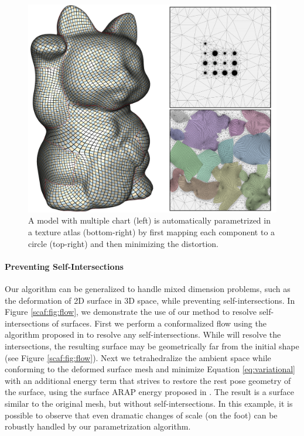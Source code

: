 \begin{figure}[t]
\includegraphics[width=\columnwidth]{scaf-tex/figs/maneki_neko_colorful}
\caption{A model with multiple chart (left) is automatically parametrized in a texture atlas (bottom-right) by first mapping each component to a circle (top-right) and then minimizing the distortion.}
\label{scaf:fig:packing2D}
\end{figure}

\paragraph{Preventing Self-Intersections}
Our algorithm can be generalized to handle mixed dimension problems, such as the deformation of 2D surface in 3D space, while preventing self-intersections. In Figure \ref{scaf:fig:flow}, we demonstrate the use of our method to resolve self-intersections of surfaces. First we perform a conformalized flow \cite{Kazhdan:2012} using the algorithm proposed in \cite{Sacht:2013} to resolve any self-intersections.  While \cite{Sacht:2013} will resolve the intersections, the resulting surface may be geometrically far from the initial shape (see Figure \ref{scaf:fig:flow}).  Next we tetrahedralize the ambient space while conforming to the deformed surface mesh and minimize Equation \ref{eq:variational} with an additional energy term that strives to restore the rest pose geometry of the surface, using the surface ARAP energy proposed in \cite{Sorkine:2007}. The result is a surface similar to the original mesh, but without self-intersections. In this example, it is possible to observe that even dramatic changes of scale (on the foot) can be robustly handled by our parametrization algorithm.


